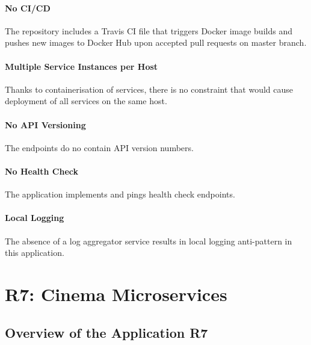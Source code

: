 \documentclass{Configuration_Files/PoliMi3i_thesis}
\begin{document}
\paragraph{No CI/CD} The repository includes a Travis CI file that triggers Docker image builds and pushes new images to Docker Hub upon accepted pull requests on master branch.

\paragraph{Multiple Service Instances per Host} Thanks to containerisation of services, there is no constraint that would cause deployment of all services on the same host.

\paragraph{No API Versioning} The endpoints do no contain API version numbers.

\paragraph{No Health Check} The application implements and pings health check endpoints.

\paragraph{Local Logging} The absence of a log aggregator service results in local logging anti-pattern in this application.

\section{R7: Cinema Microservices}
\label{sec:R7}

\subsection{Overview of the Application R7}
\label{subsec:R7_overview}
\end{document}
